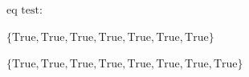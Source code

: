 \documentclass{article}
\begin{document}
\begin{doublespace}
\noindent\(\text{eq test:}\)
\end{doublespace}

\begin{doublespace}
\noindent\(\{\text{True},\text{True},\text{True},\text{True},\text{True},\text{True},\text{True}\}\)
\end{doublespace}

\begin{doublespace}
\noindent\(\{\text{True},\text{True},\text{True},\text{True},\text{True},\text{True},\text{True},\text{True}\}\)
\end{doublespace}

\begin{doublespace}
\noindent\(\pmb{\text{}}\)
\end{doublespace}
\end{document}
